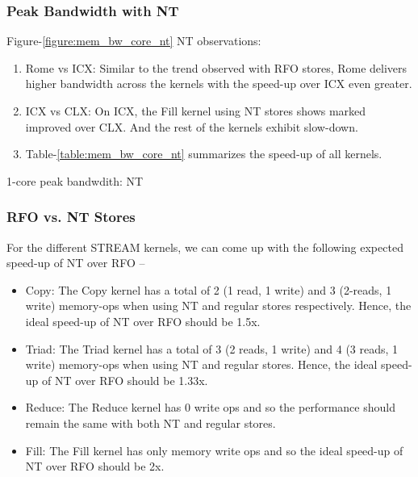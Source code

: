 \documentclass{article}
\begin{document}
\subsubsection{Peak Bandwidth with NT}

Figure-\ref{figure:mem_bw_core_nt} NT observations:
\begin{enumerate}
\item Rome vs ICX: Similar to the trend observed with RFO stores, Rome delivers higher bandwidth across the kernels with the speed-up over ICX even greater. 
\item ICX vs CLX: On ICX, the Fill kernel using NT stores shows marked improved over CLX. And the rest of the kernels exhibit slow-down.
\item Table-\ref{table:mem_bw_core_nt} summarizes the speed-up of all kernels.
\end{enumerate}


\begin{table}[h!]
\centering

\caption{1-core peak bandwdith: NT}
\label{table:mem_bw_core_nt}
\end{table}

\subsubsection{RFO vs. NT Stores}
For the different STREAM kernels, we can come up with the following expected speed-up of NT over RFO --
\begin{itemize}
\item Copy: The Copy kernel has a total of 2 (1 read, 1 write) and 3 (2-reads, 1 write) memory-ops when using NT and regular stores respectively. Hence, the ideal speed-up of NT over RFO should be 1.5x.
\item Triad: The Triad kernel has a total of 3 (2 reads, 1 write) and 4 (3 reads, 1 write) memory-ops when using NT and regular stores. Hence, the ideal speed-up of NT over RFO should be 1.33x.
\item Reduce: The Reduce kernel has 0 write ops and so the performance should remain the same with both NT and regular stores.
\item Fill: The Fill kernel has only memory write ops and so the ideal speed-up of NT over RFO should be 2x.
\end{itemize}
\end{document}
